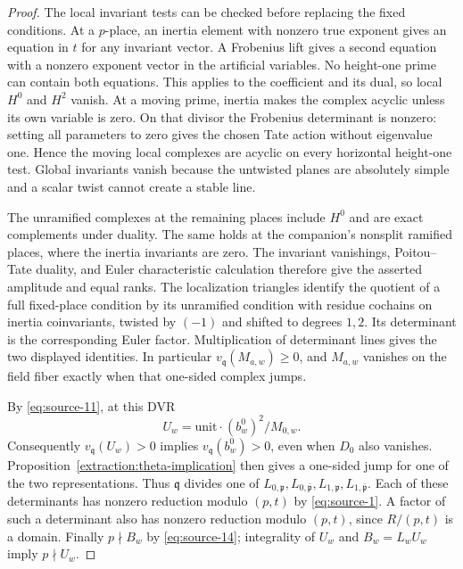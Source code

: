 \begin{proof}
The local invariant tests can be checked before replacing the fixed
conditions.  At a $p$-place, an inertia element with nonzero true
exponent gives an equation in $t$ for any invariant vector.  A
Frobenius lift gives a second equation with a nonzero exponent vector
in the artificial variables.  No height-one prime can contain both
equations.  This applies to the coefficient and its dual, so local
$H^0$ and $H^2$ vanish.  At a moving prime, inertia makes the complex
acyclic unless its own variable is zero.  On that divisor the
Frobenius determinant is nonzero: setting all parameters to zero
gives the chosen Tate action without eigenvalue one.  Hence the
moving local complexes are acyclic on every horizontal height-one
test.  Global invariants vanish because the untwisted planes are
absolutely simple and a scalar twist cannot create a stable line.

The unramified complexes at the remaining places include $H^0$ and
are exact complements under duality.  The same holds at the
companion's nonsplit ramified places, where the inertia invariants
are zero.  The invariant vanishings, Poitou--Tate duality, and Euler
characteristic calculation therefore give the asserted amplitude
and equal ranks.  The localization triangles identify the quotient
of a full fixed-place condition by its unramified condition with
residue cochains on inertia coinvariants, twisted by $(-1)$ and
shifted to degrees $1,2$.  Its determinant is the corresponding
Euler factor.  Multiplication of determinant lines gives the two
displayed identities.  In particular $v_{\mathfrak q}(M_{a,w})\geq0$,
and $M_{a,w}$ vanishes on the field fiber exactly when that
one-sided complex jumps.

By \eqref{eq:source-11}, at this DVR
\[
 U_w=\text{unit}\cdot (b_w^0)^2/M_{0,w}.
\]
Consequently $v_{\mathfrak q}(U_w)>0$ implies
$v_{\mathfrak q}(b_w^0)>0$, even when $D_0$ also vanishes.
Proposition~\ref{extraction:theta-implication} then gives a one-sided
jump for one of the two representations.  Thus $\mathfrak q$ divides
one of $L_{0,\mathfrak p},L_{0,\bar{\mathfrak p}},
L_{1,\mathfrak p},L_{1,\bar{\mathfrak p}}$.
Each of these determinants has nonzero reduction modulo $(p,t)$ by
\eqref{eq:source-1}.  A factor of such a determinant also has nonzero
reduction modulo $(p,t)$, since $R/(p,t)$ is a domain.
Finally $p\nmid B_w$ by \eqref{eq:source-14}; integrality of $U_w$
and $B_w=L_wU_w$ imply $p\nmid U_w$.
\end{proof}

